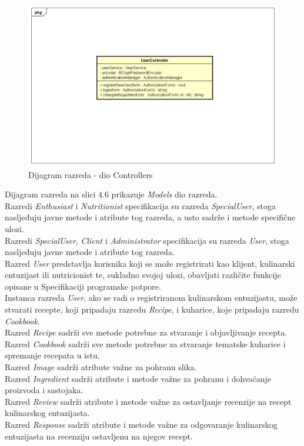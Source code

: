 	  \begin{figure}[H]
			\includegraphics[scale=0.5]{dijagrami/UML_dijagram_razreda_controllers.png} %
			\centering
			\caption{Dijagram razreda - dio Controllers}
			\label{Dijagram razreda - dio Controllers}
		\end{figure}
			
			
			\eject 	
			
Dijagram razreda na slici 4.6 prikazuje \textit{Models} dio razreda. \\
	Razredi \textit{Enthusiast} i \textit{Nutritionist} specifikacija su razreda \textit{SpecialUser}, stoga nasljeđuju javne metode i atribute tog razreda, a usto sadrže i metode specifične ulozi. \\
	Razredi \textit{SpecialUser}, \textit{Client} i \textit{Administrator} specifikacija su razreda \textit{User}, stoga nasljeđuju javne metode i atribute tog razreda. \\
	Razred \textit{User} predstavlja korisnika koji se može registrirati kao klijent, kulinarski entuzijast ili nutricionist te, sukladno svojoj ulozi, obavljati različite funkcije opisane u Specifikaciji programske potpore. \\
    Instanca razreda \textit{User}, ako se radi o registriranom kulinarskom entuzijastu, može stvarati recepte, koji pripadaju razredu \textit{Recipe}, i kuharice, koje pripadaju razredu \textit{Cookbook}. \\
    Razred \textit{Recipe} sadrži sve metode potrebne za stvaranje i objavljivanje recepta. \\
    Razred \textit{Cookbook} sadrži sve metode potrebne za stvaranje tematske kuharice i spremanje recepata u istu. \\
    Razred \textit{Image} sadrži atribute važne za pohranu slika. \\
    Razred \textit{Ingredient} sadrži atribute i metode važne za pohranu i dohvaćanje proizvoda i sastojaka. \\
    Razred \textit{Review} sadrži atribute i metode važne za ostavljanje recenzije na recept kulinarskog entuzijasta. \\
    Razred \textit{Response} sadrži atribute i metode važne za odgovaranje kulinarskog entuzijasta na recenziju ostavljenu na njegov recept.
			
